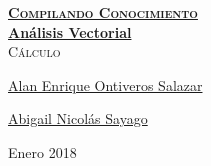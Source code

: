 \documentclass[12pt, fleqn]{report}                             %
\author{Oscar Andrés Rosas}                                     %
\theoremstyle{break}                                            %
\begin{document}
\begin{titlepage}
    
    \pagecolor{TitlePageColor}                                      %
    \color{white}                                                   %
    \newcommand{\Github}{https://github.com/compilandoconocimiento} %

    \vspace                                                         %
    \baselineskip                                                   %

    \makebox[0pt][l]{\rule{1.3\textwidth}{3pt}}                     %
    
    \href{\Github}                                                  %
    {\textbf{\textsc{\Huge Compilando Conocimiento}}}\\[2.7cm]      %

    \href{\Github/LibroAnalisisVectorial}                           %
    {\fontsize{55}{66}\selectfont                                   %
        \textbf{Análisis Vectorial}}\\[0.5cm]                       %
    \textcolor{ColorSubtext}{\textsc{\Huge Cálculo}}                %
    
    \vfill                                                          %
    
    \href{https://github.com/alaneos777}                            %
    {\LARGE \textsf{Alan Enrique Ontiveros Salazar}}                %

    \href{https://github.com/abiisnn}                               %
    {\LARGE \textsf{Abigail Nicolás Sayago }}                       %

    \vspace                                                         %
    \baselineskip                                                   %
    
    {\large \textsf{Enero 2018}}                                    %

\end{titlepage}
\end{document}
